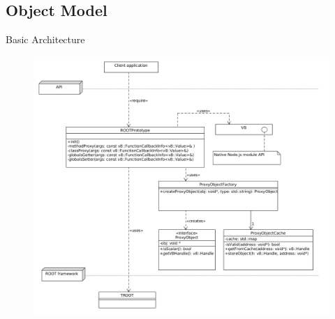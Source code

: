 \subsection{Object Model}

\begin{frame}{Basic Architecture}
  \begin{figure}[htb]
    \centering
      \includegraphics[width=\textwidth, height=0.85\textheight, keepaspectratio]{./resources/architecture.png}
    \end{figure}
\end{frame}
